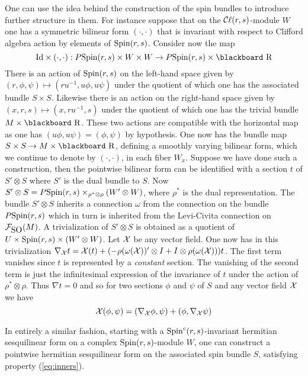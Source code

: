 \documentclass[12pt,titlepage]{article}
\def\bbf#1{\hbox{\blackboard #1}}
\def\lR{\bbf R}
\def\cC{{\cal C}}
\def\cF{{\cal F}}
\def\cX{{\cal X}}
\def\Cl{{\cC\ell}}
\def\SO{\hbox{SO}}
\def\Spin{\hbox{Spin}}
\def\Id{\hbox{Id}}
\begin{document}
One can use the idea behind the construction of the spin bundles 
to introduce 
further structure in them. For instance suppose that on the 
\(\Cl(r,s)\)-module \(W\) one has a symmetric bilinear  form 
\((\cdot,\cdot)\) that is invariant with respect 
to Clifford algebra action by 
elements of \(\Spin (r,s)\). Consider now the map
\[%
\Id\times(\cdot,\cdot):P\Spin(r,s)\times
W \times W \to P\Spin(r,s)\times \lR
\]%
There is an action of \(\Spin(r,s)\) on the left-hand space given by
\((r,\phi,\psi)\mapsto (ru^{-1}, u\phi, u\psi)\) under the
quotient of which one has  the associated bundle
\(S\times S\). Likewise there is an action on the right-hand
space
given by \((x,r,s)\mapsto (x, ru^{-1},s)\) under the
quotient of which one has  the trivial bundle \linebreak
\(M\times\lR\). These two actions are compatible with the horizontal map as 
one
has \( (u\phi,u\psi) = (\phi,\psi)\) by hypothesis. 
One now has the  bundle map
\(S\times S \to M\times \lR\), defining a smoothly varying bilinear 
form, which we continue to denote by \((\cdot,\cdot)\), in each fiber
\(W_x\). 
Suppose we have done such a construction, then the pointwise bilinear 
form can be identified with a section \(t\) of \(S'\otimes S\) where \(S'\) 
is the dual bundle to \(S\). Now \(S'\otimes 
S=P\Spin(r,s)\times_{\rho^*\otimes\rho}(W'\otimes W)\), where 
\(\rho^*\) is the dual representation.  The bundle 
\(S'\otimes S\) inherits a connection \(\omega\) from the 
connection on the bundle \(P\Spin(r,s)\) which in turn is inherited from 
the Levi-Civita connection on \(\cF_{\SO}(M)\). 
A trivialization of \(S'\otimes S\) is 
obtained as a quotient of \(U\times \Spin(r,s)\times (W'\otimes W)\). Let  
\(\cX\) be any vector field. One now has in this trivialization  
\(\nabla_{\cX} t =
\cX(t) +(-\rho(\omega(\cX))'\otimes I + I\otimes \rho(\omega(\cX)))t\).
The first term vanishes since \(t\) is represented by a {\em constant\/} 
section. The vanishing of the second term is just the infinitesimal 
expression of the invariance of  \(t\) under the action of \(\rho^*\otimes 
\rho\).
Thus \(\nabla t = 0\) and so for two sections \(\phi\) 
and \(\psi\) of \(S\) 
and any vector field \(\cX\) we have
\begin{equation}\label{eq:inners}%
\cX(\phi,\psi)=(\nabla_{\cX}\phi,\psi) +(\phi,\nabla_{\cX}\psi)
\end{equation}%

In entirely a similar fashion, starting with a
\(\Spin^c(r,s)\)-invariant hermitian sesquilinear form on a complex
\(\Spin(r,s)\)-module \(W\), one can construct a pointwise hermitian
sesquilinear form on the associated spin bundle \(S\), satisfying
property (\ref{eq:inners}).
\end{document}
